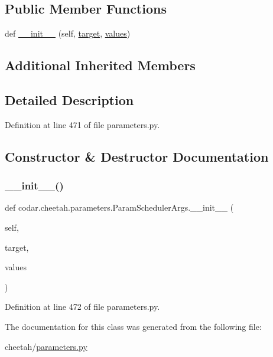 \subsection*{Public Member Functions}
\begin{DoxyCompactItemize}
\item 
def \hyperlink{classcodar_1_1cheetah_1_1parameters_1_1_param_scheduler_args_abdc6ffa1471d8207fb6de1222791ef87}{\+\_\+\+\_\+init\+\_\+\+\_\+} (self, \hyperlink{classcodar_1_1cheetah_1_1parameters_1_1_param_a5603d43a20cfc6447c3718406ce0669e}{target}, \hyperlink{classcodar_1_1cheetah_1_1parameters_1_1_param_aefcc82658f511bddd6605e6ac6e74fbf}{values})
\end{DoxyCompactItemize}
\subsection*{Additional Inherited Members}


\subsection{Detailed Description}


Definition at line 471 of file parameters.\+py.



\subsection{Constructor \& Destructor Documentation}
\mbox{\label{classcodar_1_1cheetah_1_1parameters_1_1_param_scheduler_args_abdc6ffa1471d8207fb6de1222791ef87}} 
\subsubsection{\texorpdfstring{\+\_\+\+\_\+init\+\_\+\+\_\+()}{\_\_init\_\_()}}
{\footnotesize\ttfamily def codar.\+cheetah.\+parameters.\+Param\+Scheduler\+Args.\+\_\+\+\_\+init\+\_\+\+\_\+ (\begin{DoxyParamCaption}\item[{}]{self,  }\item[{}]{target,  }\item[{}]{values }\end{DoxyParamCaption})}



Definition at line 472 of file parameters.\+py.



The documentation for this class was generated from the following file\+:\begin{DoxyCompactItemize}
\item 
cheetah/\hyperlink{parameters_8py}{parameters.\+py}\end{DoxyCompactItemize}
